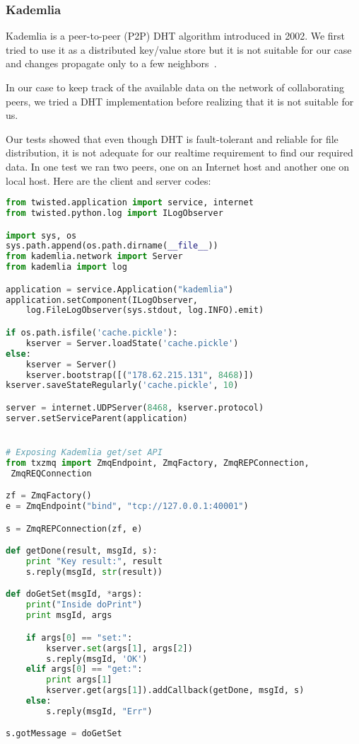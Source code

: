 \subsubsection{Kademlia}
Kademlia is a peer-to-peer (P2P) DHT algorithm introduced in 2002. We first tried to use it as a distributed key/value store but 
it is not suitable for our case and changes propagate only to a few neighbors~\cite{KademliaPaper}.

In our case to keep track of the available data on the network of collaborating peers, 
we tried a DHT implementation before realizing that it is not suitable for us.

Our tests showed that even though DHT is fault-tolerant and reliable for file distribution,
it is not adequate for our realtime requirement to find our required data. In one test we ran two peers,
one on an Internet host and another one on local host. Here are the client and server codes:

\begin{lstlisting}[language=python, caption={A twisted application to run Kademlia DHT}]
from twisted.application import service, internet
from twisted.python.log import ILogObserver

import sys, os
sys.path.append(os.path.dirname(__file__))
from kademlia.network import Server
from kademlia import log

application = service.Application("kademlia")
application.setComponent(ILogObserver, 
	log.FileLogObserver(sys.stdout, log.INFO).emit)

if os.path.isfile('cache.pickle'):
    kserver = Server.loadState('cache.pickle')
else:
    kserver = Server()
    kserver.bootstrap([("178.62.215.131", 8468)])
kserver.saveStateRegularly('cache.pickle', 10)

server = internet.UDPServer(8468, kserver.protocol)
server.setServiceParent(application)


# Exposing Kademlia get/set API
from txzmq import ZmqEndpoint, ZmqFactory, ZmqREPConnection,
 ZmqREQConnection

zf = ZmqFactory()
e = ZmqEndpoint("bind", "tcp://127.0.0.1:40001")

s = ZmqREPConnection(zf, e)

def getDone(result, msgId, s):
    print "Key result:", result
    s.reply(msgId, str(result))

def doGetSet(msgId, *args):
    print("Inside doPrint")
    print msgId, args

    if args[0] == "set:":
        kserver.set(args[1], args[2])
        s.reply(msgId, 'OK')
    elif args[0] == "get:":
        print args[1]
        kserver.get(args[1]).addCallback(getDone, msgId, s)
    else:
        s.reply(msgId, "Err")

s.gotMessage = doGetSet
\end{lstlisting}

